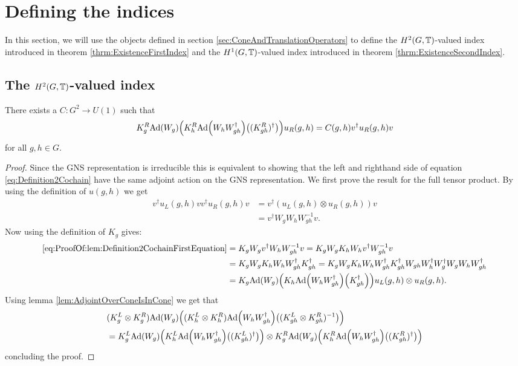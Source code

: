 \documentclass[11pt,a4paper,twoside]{article}
\numberwithin{equation}{section}
\begin{document}
	\section{Defining the indices}
	In this section, we will use the objects defined in section \ref{sec:ConeAndTranslationOperators} to define the $H^2(G,\mathbb T)$-valued index introduced in theorem \ref{thrm:ExistenceFirstIndex} and the $H^1(G,\mathbb T)$-valued index introduced in theorem \ref{thrm:ExistenceSecondIndex}.
	\subsection{The $H^2(G,\mathbb T)$-valued index}\label{sec:DefinitionH2Index}
	\begin{lemma}\label{lem:Definition2Cochain}
		There exists a $C:G^2\rightarrow U(1)$ such that 
		\begin{equation}\label{eq:Definition2Cochain}
			K_g^R\Ad{W_g}\left(K_h^R\Ad{W_hW_{gh}^\dagger}\left((K_{gh}^R)^\dagger\right)\right)u_
			R(g,h)=C(g,h)v^\dagger u_R(g,h)v
		\end{equation}
		for all $g,h\in G.$
	\end{lemma}
	\begin{proof}
		Since the GNS representation is irreducible this is equivalent to showing that the left and righthand side of equation \eqref{eq:Definition2Cochain} have the same adjoint action on the GNS representation. We first prove the result for the full tensor product. By using the definition of $u(g,h)$ we get
		\begin{align}\label{eq:ProofOf:lem:Definition2CochainFirstEquation}
			v^\dagger u_L(g,h)v v^\dagger u_R(g,h) v&=v^\dagger (u_L(g,h)\otimes u_R(g,h)) v\\
			&=v^\dagger W_g W_h W_{gh}^{-1}v.
		\end{align}
		Now using the definition of $K_g$ gives:
		\begin{align}
			\eqref{eq:ProofOf:lem:Definition2CochainFirstEquation}&=K_gW_g v^\dagger W_h W_{gh}^{-1}v=K_gW_g K_h W_h v^\dagger W_{gh}^{-1}v\\
			&=K_gW_g K_h W_h W_{gh}^\dagger K_{gh}^\dagger=K_gW_g K_h W_h W_{gh}^\dagger K_{gh}^\dagger W_{gh}W_h^\dagger W_g^\dagger W_gW_hW_{gh}^\dagger\\
			&=K_g\Ad{W_g}\left(K_h\Ad{W_hW_{gh}^\dagger}\left(K_{gh}^\dagger\right)\right)u_L(g,h)\otimes u_
			R(g,h).
		\end{align}
		Using lemma \ref{lem:AdjointOverConeIsInCone} we get that
		\begin{align}
			&(K_g^L\otimes K_g^R)\Ad{W_g}\left((K_h^L\otimes K_h^R)\Ad{W_hW_{gh}^\dagger}\left((K_{gh}^L\otimes K_{gh}^R)^{-1}\right)\right)\\
			&=K_g^L\Ad{W_g}\left(K_h^L\Ad{W_hW_{gh}^\dagger}\left((K_{gh}^L)^\dagger\right)\right)\otimes K_g^R\Ad{W_g}\left(K_h^R\Ad{W_hW_{gh}^\dagger}\left((K_{gh}^R)^\dagger\right)\right)
		\end{align}
		concluding the proof.
	\end{proof}
\end{document}
